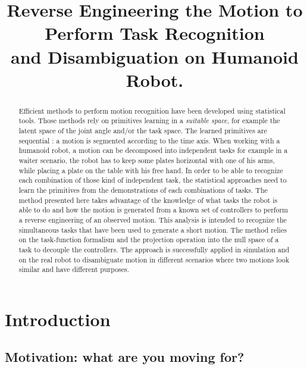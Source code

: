 \documentclass[letterpaper, 10pt, conference]{ieeeconf}      %
\title{\LARGE \bf
Reverse Engineering the Motion to Perform Task Recognition\\ and Disambiguation on Humanoid Robot.
}
\begin{document}
\maketitle
\thispagestyle{empty}
\pagestyle{empty}


\begin{abstract}
Efficient methods to perform motion recognition have been developed
using statistical tools. Those methods rely on primitives learning
in a \emph{suitable space}, for example the latent space of the joint angle and/or the task space.
The learned primitives are sequential : a motion is segmented according to the time axis.
When working with a humanoid robot, a motion can be decomposed into
independent tasks for example in a waiter scenario,
the robot has to keep some plates horizontal with one of his arms, while placing a plate
on the table with his free hand.
In order to be able to recognize each combination of those kind of independent task,
the statistical approaches need to learn the primitives from the demonstrations of each
combinations of tasks.
The method presented here
takes advantage of the knowledge of what tasks the robot is able to do and how
the motion is generated from a known set of controllers to perform a reverse engineering of an
observed motion. This analysis is intended to recognize the simultaneous tasks that
have been used to generate a short motion. The method relies
on the task-function formalism and the projection operation into the null space of a task to decouple
the controllers.
The approach is successfully applied in simulation and on the real robot
to disambiguate motion in different scenarios where two motions look similar and have
different purposes.
\end{abstract}

\section{Introduction}
\subsection{Motivation: what are you moving for?}
\end{document}
